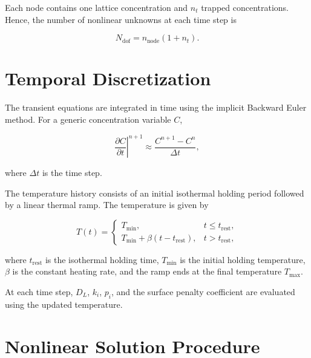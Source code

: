 \documentclass[a4paper,12pt,oneside]{report}
\begin{document}
Each node contains one lattice concentration
and $n_t$ trapped concentrations. Hence, the number of nonlinear
unknowns at each time step is

\begin{equation}
N_{\mathrm{dof}}
=
n_{\mathrm{node}}(1+n_t).
\end{equation}

\section{Temporal Discretization}
\label{sec:ch3_temporal}

The transient equations are integrated in time using the implicit
Backward Euler method. For a generic concentration variable $C$,

\begin{equation}
\left.
\frac{\partial C}{\partial t}
\right|^{n+1}
\approx
\frac{C^{n+1}-C^n}{\Delta t},
\end{equation}

where $\Delta t$ is the time step.

The temperature history consists of an initial isothermal holding
period followed by a linear thermal ramp. The temperature is given
by

\begin{equation}
T(t)=
\begin{cases}
T_{\min},
&
t\leq t_{\mathrm{rest}},
\\[4pt]
T_{\min}
+
\beta(t-t_{\mathrm{rest}}),
&
t>t_{\mathrm{rest}},
\end{cases}
\label{eq:ch3_temperature}
\end{equation}

where $t_{\mathrm{rest}}$ is the isothermal holding time, $T_{\min}$ is
the initial holding temperature, $\beta$ is the constant heating rate,
and the ramp ends at the final temperature $T_{\max}$.

At each time step, $D_L$, $k_i$, $p_i$, and the surface penalty
coefficient are evaluated using the updated temperature.

\section{Nonlinear Solution Procedure}
\label{sec:ch3_nonlinear}
\end{document}
